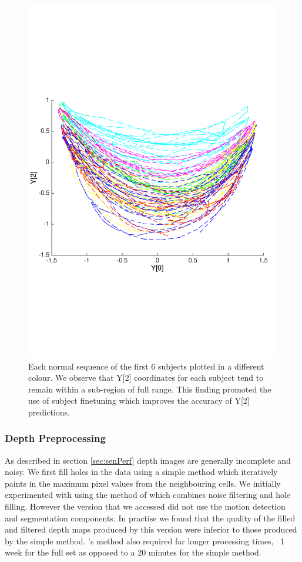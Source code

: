 \documentclass[11pt]{article} %
\begin{document}
\begin{figure}
\centering
\includegraphics*[trim={0 5cm 0 7cm},clip,width=0.75\linewidth,clip]{subjectsOnManifold.pdf} 
\caption{Each normal sequence of the first 6 subjects plotted in a different colour. We observe that Y[2] coordinates for each subject tend to remain within a sub-region of full range. This finding promoted the use of subject finetuning which improves the accuracy of Y[2] predictions. }
\label{fig:subjectsOnManifold}
\end{figure}













\subsubsection{Depth Preprocessing}

As described in section \ref{sec:senPerf} depth images are generally incomplete and noisy. We first fill holes in the data using a simple method which iteratively paints in the maximum pixel values from the neighbouring cells. We initially experimented with using the method of \cite{Camplani2012a} which combines noise filtering and hole filling. However the version that we accessed did not use the motion detection and segmentation components. In practise we found that the quality of the filled and filtered depth maps produced by this version were inferior to those produced by the simple method.  \cite{Camplani2012a}'s method also required far longer processing times, ~1 week for the full set as opposed to a 20 minutes for the simple method. 
\end{document}
